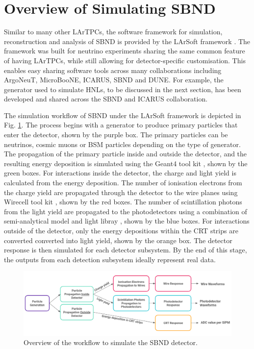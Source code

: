 \section{Overview of Simulating SBND}
\label{sec:overview_sim}

Similar to many other LArTPCs, the software framework for simulation, reconstruction and analysis of SBND is provided by the LArSoft framework \cite{larsoft}.
The framework was built for neutrino experiments sharing the same common feature of having LArTPCs, while still allowing for detector-specific customisation.
This enables easy sharing software tools across many collaborations including ArgoNeuT, MicroBooNE, ICARUS, SBND and DUNE.
For example, the generator used to simulate HNLs, to be discussed in the next section, has been developed and shared across the SBND and ICARUS collaboration.

The simulation workflow of SBND under the LArSoft framework is depicted in Fig. \ref{fig:Sim_Workflow}.
The process begins with a generator to produce primary particles that enter the detector, shown by the purple box.
The primary particles can be neutrinos, cosmic muons or BSM particles depending on the type of generator.
The propagation of the primary particle inside and outside the detector, and the resulting energy deposition is simulated using the Geant4 tool kit \cite{geant4}, shown by the green boxes.
For interactions inside the detector, the charge and light yield is calculated from the energy deposition.
The number of ionisation electrons from the charge yield are propagated through the detector to the wire planes using Wirecell tool kit \cite{wirecell}, shown by the red boxes.
The number of scintillation photons from the light yield are propagated to the photodetectors using a combination of semi-analytical model and light libray \cite{sbnd_pds_paper}, shown by the blue boxes.
For interactions outside of the detector, only the energy depositions within the CRT strips are converted converted into light yield, shown by the orange box.
The detector response is then simulated for each detector subsystem.
By the end of this stage, the outputs from each detection subsystem ideally represent real data.

\begin{figure}[htbp!] 
\centering    
\includegraphics[width=1.0\textwidth]{Sim_Workflow}
\caption[Sim_Workflow]{
Overview of the workflow to simulate the SBND detector.
}
\label{fig:Sim_Workflow}
\end{figure}

